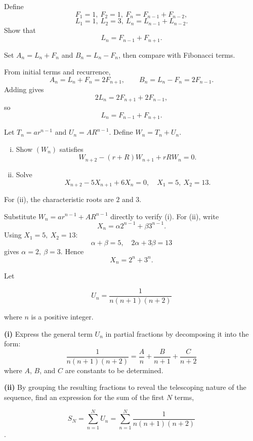 \begin{problem}
Define
\[
F_1=1,\ F_2=1,\ F_n=F_{n-1}+F_{n-2},
\]
\[
L_1=1,\ L_2=3,\ L_n=L_{n-1}+L_{n-2}.
\]
Show that
\[
L_n=F_{n-1}+F_{n+1}.
\]
\end{problem}
\begin{hint}
Set $A_n=L_n+F_n$ and $B_n=L_n-F_n$, then compare with Fibonacci terms.
\end{hint}
\begin{solution}
From initial terms and recurrence,
\[
A_n=L_n+F_n=2F_{n+1},\qquad B_n=L_n-F_n=2F_{n-1}.
\]
Adding gives
\[
2L_n=2F_{n+1}+2F_{n-1},
\]
so
\[
L_n=F_{n-1}+F_{n+1}.
\]
\end{solution}

\begin{problem}
Let $T_n=ar^{n-1}$ and $U_n=AR^{n-1}$.
Define $W_n=T_n+U_n$.
\begin{enumerate}[(i)]
\item Show $(W_n)$ satisfies
\[
W_{n+2}-(r+R)W_{n+1}+rRW_n=0.
\]
\item Solve
\[
X_{n+2}-5X_{n+1}+6X_n=0,\quad X_1=5,\ X_2=13.
\]
\end{enumerate}
\end{problem}
\begin{hint}
For (ii), the characteristic roots are $2$ and $3$.
\end{hint}
\begin{solution}
Substitute $W_n=ar^{n-1}+AR^{n-1}$ directly to verify (i).
For (ii), write
\[
X_n=\alpha 2^{n-1}+\beta 3^{n-1}.
\]
Using $X_1=5,\ X_2=13$:
\[
\alpha+\beta=5,\quad 2\alpha+3\beta=13
\]
gives $\alpha=2,\ \beta=3$.
Hence
\[
X_n=2^n+3^n.
\]
\end{solution}

\begin{problem}

Let 

$$U_n = \frac{1}{n(n+1)(n+2)}$$ 

where $n$ is a positive integer.

\textbf{(i)} Express the general term $U_n$ in partial fractions by decomposing it into the form:
\[
\frac{1}{n(n+1)(n+2)} = \frac{A}{n} + \frac{B}{n+1} + \frac{C}{n+2}
\]
where $A$, $B$, and $C$ are constants to be determined.

\textbf{(ii)} By grouping the resulting fractions to reveal the telescoping nature of the sequence, find an expression for the sum of the first $N$ terms, 

$$S_N = \sum_{n=1}^{N} U_n = \sum_{n=1}^{N} \frac{1}{n(n+1)(n+2)}$$.

\end{problem}

